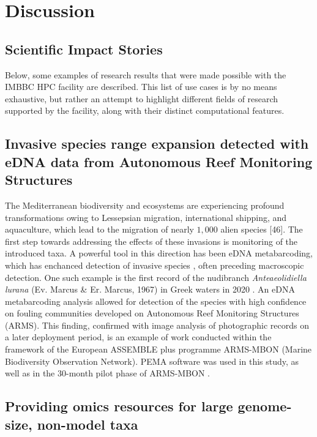    
   \section{Discussion}

   \subsection{Scientific Impact Stories}

   Below, some examples of research results that were made possible with the IMBBC HPC facility are described. This list of use cases is by no means exhaustive, but rather an attempt to highlight different fields of research supported by the facility, along with their distinct computational features.

   \subsection*{Invasive species range expansion detected with eDNA data from Autonomous Reef Monitoring Structures}

   The Mediterranean biodiversity and ecosystems are experiencing profound transformations owing to Lessepsian migration, international shipping, and aquaculture, which lead to the migration of nearly $1,000$ alien species [46]. 
   The first step towards addressing the effects of these invasions is monitoring of the introduced taxa. 
   A powerful tool in this direction has been eDNA metabarcoding, which has enchanced detection of invasive species \citep{klymus2017environmental}, often preceding macroscopic detection. 
   One such example is the first record of the nudibranch \textit{Anteaeolidiella lurana} (Ev. Marcus \& Er. Marcus, 1967) in Greek waters in 2020 \citep{bariche2020new}. 
   An eDNA metabarcoding analysis allowed for detection of the species with high confidence on fouling communities developed on Autonomous Reef Monitoring Structures (ARMS). 
   This finding, confirmed with image analysis of photographic records on a later deployment period, is an example of work conducted within the framework of the European ASSEMBLE plus programme ARMS-MBON (Marine Biodiversity Observation Network). 
   PEMA software \citep{zafeiropoulos2020pema} was used in this study, as well as in the $30$-month pilot phase of ARMS-MBON \citep{katsanevakis2014invading}.

   \subsection*{Providing omics resources for large genome-size, non-model taxa}

